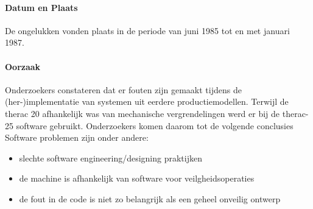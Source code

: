 \documentclass{article}
\begin{document}
	\paragraph{Datum en Plaats}
	De ongelukken vonden plaats in de periode van juni 1985 tot en met januari 1987.
	\paragraph{Oorzaak}
	\newline \indent  
	Onderzoekers constateren dat er fouten zijn gemaakt tijdens de (her-)implementatie van systemen uit eerdere productiemodellen.  
	Terwijl de therac 20 afhankelijk was van mechanische vergrendelingen werd er bij de therac-25 software gebruikt.
	Onderzoekers komen daarom tot de volgende conclusies
	Software problemen zijn onder andere:
	\begin{itemize}
		\item slechte software engineering/designing praktijken
		\item de machine is   afhankelijk  van software voor veilgheidsoperaties
		\item de fout in de code is niet zo belangrijk als een geheel onveilig ontwerp
	\end{itemize}
	
\end{document}
